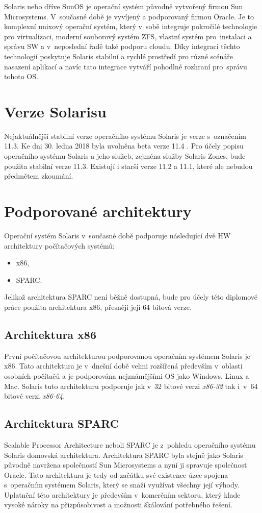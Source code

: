 Solaris nebo dříve SunOS je operační systém původně vytvořený firmou Sun Microsystems. V~současné době je vyvíjený a podporovaný
firmou Oracle. Je to komplexní unixový operační systém, který v~sobě integruje pokročilé technologie pro virtualizaci, moderní
souborový systém ZFS, vlastní systém pro~instalaci a správu SW a v~neposlední řadě také podporu cloudu. Díky integraci těchto
technologií poskytuje Solaris stabilní a rychlé prostředí pro různé scénáře nasazení aplikací a navíc tato integrace vytváří
pohodlné rozhraní pro~správu tohoto OS. 
\section{Verze Solarisu}
\label{chapter:solaris:version}
Nejaktuálnější stabilní verze operačního systému Solaris je verze s~označením 11.3. Ke dni 30. ledna 2018 byla uvolněna beta
verze 11.4 \cite{oracle:solaris:beta}. Pro účely popisu operačního systému Solaris a jeho služeb, zejména služby Solaris Zones,
bude použita stabilní verze 11.3. Existují i starší verze 11.2 a 11.1, které ale nebudou předmětem zkoumání.
\section{Podporované architektury}
\label{chapter:solaris:support}
Operační systém Solaris v~současné době podporuje následující dvě HW architektury počítačových systémů:
\begin{itemize}
 \item x86,
 \item SPARC.
\end{itemize}
Jelikož architektura SPARC není běžně dostupná, bude pro účely této diplomové práce použita architektura x86, přesněji
její 64 bitová verze.
\subsection{Architektura x86}
\label{chapter:solaris:support:x86}
První počítačovou architekturou podporovanou operačním systémem Solaris je x86. Tato architektura je v~dnešní době velmi rozšířená
především v~oblasti osobních počítačů a je podporována nejznámějšími OS jako Windows, Linux a Mac. Solaris tuto architekturu
podporuje jak v~32 bitové verzi \textit{x86-32} tak i~v~64 bitové verzi \textit{x86-64}.
\subsection{Architektura SPARC}
\label{chapter:solaris:support:sparc}
Scalable Processor Architecture neboli SPARC je z~pohledu operačního systému Solaris domovská architektura. Architektura SPARC
byla stejně jako Solaris původně navržena společností Sun Microsystems a nyní ji spravuje společnost Oracle. Tato architektura
je tedy od začátku své existence úzce spojena s~operačním systémem Solaris, který se snaží využívat všechny její výhody.
Uplatnění této architektury je především v~komerčním sektoru, který klade vysoké nároky na přizpůsobivost a možnosti škálování
potřebného řešení.
